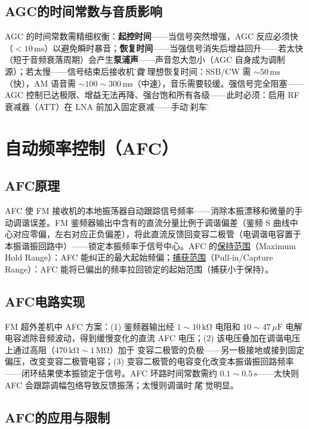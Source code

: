 \documentclass[12pt,UTF8]{ctexbook}
\begin{document}
\subsection{AGC的时间常数与音质影响}

AGC 的时间常数需精细权衡：\textbf{起控时间}——当信号突然增强，AGC 反应必须快（$<10\,\mathrm{ms}$）以避免瞬时暴音；\textbf{恢复时间}——当强信号消失后增益回升——若太快（短于音频衰落周期）会产生\textbf{泵浦声}——声音忽大忽小（AGC 自身成为调制源）；若太慢——信号结束后接收机\"暂聋\"。理想恢复时间：SSB/CW 需 $\sim50\,\mathrm{ms}$（快），AM 语音需 $\sim100\sim300\,\mathrm{ms}$（中速），音乐需要较缓。强信号完全阻塞——AGC 控制已达极限、增益无法再降、强台饱和所有各级——此时必须：启用 RF 衰减器（ATT）在 LNA 前加入固定衰减——手动\"踩刹车\"。

\section{自动频率控制（AFC）}
\label{sec:afc}

\subsection{AFC原理}

AFC 使 FM 接收机的本地振荡器自动跟踪信号频率——消除本振漂移和微量的手动调谐误差。FM 鉴频器输出中含有的直流分量比例于调谐偏差（鉴频 S 曲线中心对应零偏，左右对应正负偏差），将此直流反馈回变容二极管（电调谐电容置于本振谐振回路中）——锁定本振频率于信号中心。AFC 的\underline{保持范围}（Maximum Hold Range）：AFC 能纠正的最大起始频偏；\underline{捕获范围}（Pull-in/Capture Range）：AFC 能将已偏出的频率拉回锁定的起始范围（捕获小于保持）。

\subsection{AFC电路实现}

FM 超外差机中 AFC 方案：(1) 鉴频器输出经 $1\sim10\,\mathrm{k\Omega}$ 电阻和 $10\sim47\,\mu\mathrm{F}$ 电解电容滤除音频波动，得到缓慢变化的直流 AFC 电压；(2) 该电压叠加在调谐电压上通过高阻（$470\,\mathrm{k\Omega}\sim1\,\mathrm{M\Omega}$）加于 变容二极管的负极——另一极接地或接到固定偏压，改变变容二极管电容；(3) 变容二极管的电容变化改变本振谐振回路频率——闭环结果使本振锁定于信号。AFC 环路时间常数需约 $0.1\sim0.5\,\mathrm{s}$——太快则 AFC 会跟踪调幅包络导致反馈振荡；太慢则调谐时\"拖尾\"感觉明显。

\subsection{AFC的应用与限制}
\end{document}
